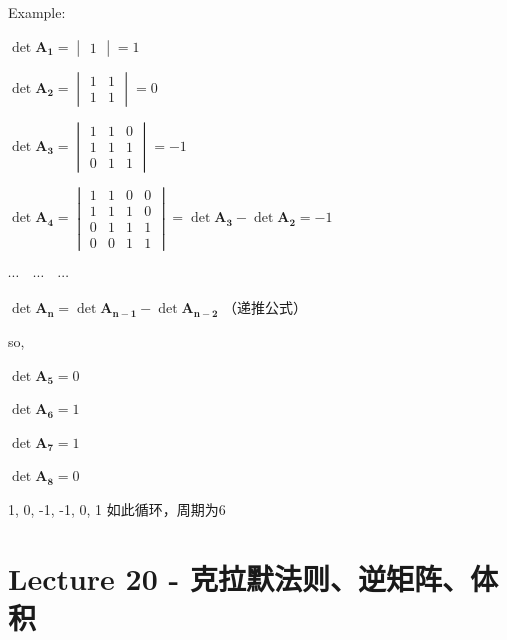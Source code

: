 \documentclass[12pt, a4paper]{article}
\begin{document}
{\newline
Example:
\par 
\begin{math}
	\det{\mathbf{A_1}} = 
	\begin{vmatrix}
		1
	\end{vmatrix}
	 = 1
\end{math}
\par 
\begin{math}
	\det{\mathbf{A_2}} = 
	\begin{vmatrix}
		1 & 1 \\
		1 & 1 
	\end{vmatrix}
	= 0
\end{math}
\par 
\begin{math}
	\det{\mathbf{A_3}} = 
	\begin{vmatrix}
		1 & 1 & 0 \\
		1 & 1 & 1 \\
		0 & 1 & 1 
	\end{vmatrix}
	= -1
\end{math}
\par 
\begin{math}
	\det{\mathbf{A_4}} = 
	\begin{vmatrix}
		1 & 1 & 0 & 0 \\
		1 & 1 & 1 & 0 \\
		0 & 1 & 1 & 1 \\
		0 & 0 & 1 & 1 
	\end{vmatrix}
	= \det{\mathbf{A_3}} - \det{\mathbf{A_2}}
	= -1
\end{math}
\par $\cdots \quad \cdots \quad \cdots$
\par $\det{\mathbf{A_n}} = \det{\mathbf{A_{n-1}}} - \det{\mathbf{A_{n-2}}}$ \qquad （递推公式）
\par so, 
\par $\det{\mathbf{A_5}}=0$
\par $\det{\mathbf{A_6}}=1$
\par $\det{\mathbf{A_7}}=1$
\par $\det{\mathbf{A_8}}=0$
\par 1, 0, -1, -1, 0, 1 如此循环，周期为6

\newpage
\section{Lecture 20 - 克拉默法则、逆矩阵、体积}
\pagestyle{fancy}
\lhead{}
\rhead{}

}
\end{document}
